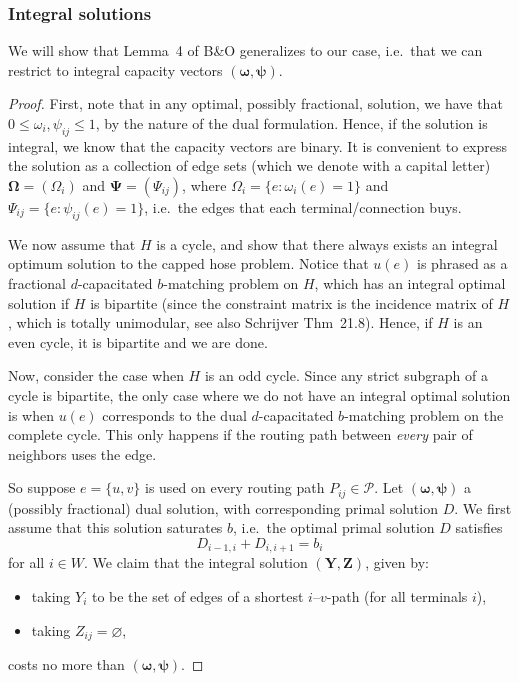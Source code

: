\documentclass[11pt]{article}
\begin{document}
    \subsubsection*{Integral solutions}
    We will show that Lemma~4 of B\&O generalizes to our case, i.e.\ that we can restrict to integral capacity vectors $(\boldsymbol \omega, \boldsymbol \psi)$.
    \begin{proof}
        First, note that in any optimal, possibly fractional, solution, we have that $0 \le \omega_i, \psi_{ij} \le 1$, by the nature of the dual formulation.
        Hence, if the solution is integral, we know that the capacity vectors are binary.
        It is convenient to express the solution as a collection of edge sets (which we denote with a capital letter) $\boldsymbol \Omega = (\Omega_i)$ and $\boldsymbol \Psi = (\Psi_{ij})$, where $\Omega_i = \{ e : \omega_i(e) = 1 \}$ and $\Psi_{ij} = \{ e : \psi_{ij}(e) = 1 \}$, i.e.\ the edges that each terminal/connection buys.

        We now assume that $H$ is a cycle, and show that there always exists an integral optimum solution to the capped hose problem.
        Notice that $u(e)$ is phrased as a fractional $d$-capacitated $b$-matching problem on $H$, which has an integral optimal solution if $H$ is bipartite (since the constraint matrix is the incidence matrix of $H$, which is totally unimodular, see also Schrijver Thm~21.8).
        Hence, if $H$ is an even cycle, it is bipartite and we are done.

        Now, consider the case when $H$ is an odd cycle.
        Since any strict subgraph of a cycle is bipartite, the only case where we do not have an integral optimal solution is when $u(e)$ corresponds to the dual $d$-capacitated $b$-matching problem on the complete cycle.
        This only happens if the routing path between \emph{every} pair of neighbors uses the edge.

        So suppose $e = \{u, v\}$ is used on every routing path $P_{ij} \in \mathcal P$.
        Let $(\boldsymbol \omega, \boldsymbol \psi)$ a (possibly fractional) dual solution, with corresponding primal solution $D$.
        We first assume that this solution saturates $b$, i.e.\ the optimal primal solution $D$ satisfies
        \[
            D_{i-1,i} + D_{i,i+1} = b_i
        \]
        for all $i \in W$.
        We claim that the integral solution $(\boldsymbol Y, \boldsymbol Z)$, given by:
        \begin{itemize}
            \item taking $Y_i$ to be the set of edges of a shortest $i$--$v$-path (for all terminals $i$),
            \item taking $Z_{ij} = \varnothing$,
        \end{itemize}
        costs no more than $(\boldsymbol \omega, \boldsymbol \psi)$.


\end{proof}
\end{document}
